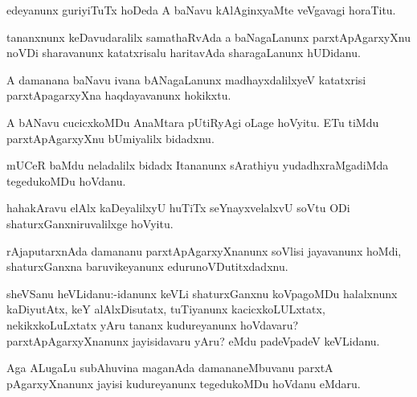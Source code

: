 \documentclass{article}
\begin{document}
\begin{mn}%
edeyanunx guriyiTuTx hoDeda A baNavu kAlAginxyaMte veVgavagi horaTitu.
\end{mn}

\begin{mn}%
tananxnunx keDavudaralilx samathaRvAda a baNagaLanunx parxtApAgarxyXnu noVDi sharavanunx 
katatxrisalu haritavAda sharagaLanunx hUDidanu.
\end{mn}

\begin{mn}%
A damanana baNavu ivana bANagaLanunx madhayxdalilxyeV katatxrisi parxtApagarxyXna 
haqdayavanunx hokikxtu.
\end{mn}

\begin{mn}%
A bANavu cucicxkoMDu AnaMtara pUtiRyAgi oLage hoVyitu. ETu tiMdu parxtApAgarxyXnu 
bUmiyalilx bidadxnu.
\end{mn}

\begin{mn}%
mUCeR baMdu neladalilx bidadx Itananunx sArathiyu yudadhxraMgadiMda tegedukoMDu hoVdanu.
\end{mn}

\begin{mn}%
hahakAravu elAlx kaDeyalilxyU huTiTx seYnayxvelalxvU soVtu ODi shaturxGanxniruvalilxge 
hoVyitu.
\end{mn}

\begin{mn}%
rAjaputarxnAda damananu parxtApAgarxyXnanunx soVlisi jayavanunx hoMdi, shaturxGanxna 
baruvikeyanunx edurunoVDutitxdadxnu.
\end{mn}


\begin{mn}%
sheVSanu heVLidanu:-idanunx keVLi shaturxGanxnu koVpagoMDu halalxnunx kaDiyutAtx, keY
alAlxDisutatx, tuTiyanunx kacicxkoLULxtatx, nekikxkoLuLxtatx yAru tananx kudureyanunx 
hoVdavaru? parxtApAgarxyXnanunx jayisidavaru yAru? eMdu padeVpadeV keVLidanu.
\end{mn}

\begin{mn}%
Aga ALugaLu subAhuvina maganAda damananeMbuvanu parxtA pAgarxyXnanunx jayisi kudureyanunx 
tegedukoMDu hoVdanu eMdaru.
\end{mn}
\end{document}
